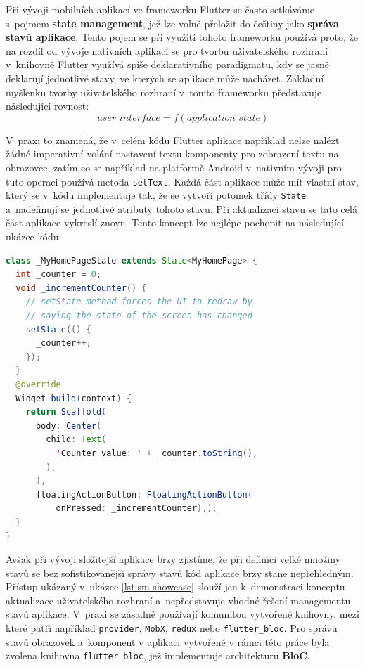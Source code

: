 \documentclass[12pt, a4paper]{article}
\begin{document}
Při vývoji mobilních aplikací ve frameworku Flutter se často setkáváme s~pojmem \textbf{state management}, jež lze volně přeložit do češtiny jako \textbf{správa stavů aplikace}. Tento pojem se při využití tohoto frameworku používá proto, že na rozdíl od vývoje nativních aplikací se pro tvorbu uživatelského rozhraní v~knihovně Flutter využívá spíše deklarativního paradigmatu, kdy se jasně deklarují jednotlivé stavy, ve kterých se aplikace může nacházet. Základní myšlenku tvorby uživatelského rozhraní v~tomto frameworku představuje následující rovnost:
$$
user\_interface = f(application\_state)
$$

V~praxi to znamená, že v~celém kódu Flutter aplikace například nelze nalézt žádné imperativní volání nastavení textu komponenty pro zobrazení textu na obrazovce, zatím co se například na
 platformě Android v~nativním vývoji pro tuto operaci používá metoda \texttt{setText}. Každá část aplikace může mít vlastní stav, který se v~kódu implementuje tak, že se vytvoří potomek 
třídy \texttt{State} a~nadefinují se jednotlivé atributy tohoto stavu. Při aktualizaci stavu se tato celá část aplikace vykreslí znovu. Tento koncept lze nejlépe pochopit na následující 
ukázce kódu:

\begin{lstlisting}[language=Java,caption={Jednoduchá demonstrace aktualizace uživatelského rozhraní ve frameworku Flutter.},captionpos=b, label={lst:sm-showcase}]
class _MyHomePageState extends State<MyHomePage> {
  int _counter = 0;
  void _incrementCounter() {
    // setState method forces the UI to redraw by
    // saying the state of the screen has changed
    setState(() {
      _counter++;
    });
  }
  @override
  Widget build(context) {
    return Scaffold(
      body: Center(
        child: Text(
          'Counter value: ' + _counter.toString(),
        ),
      ),
      floatingActionButton: FloatingActionButton(
          onPressed: _incrementCounter),);
  }
}
\end{lstlisting}

Avšak při vývoji složitejší aplikace brzy zjistíme, že při definici velké množiny stavů se bez sofistikovanější správy stavů kód aplikace brzy stane nepřehledným. Přístup ukázaný v~ukázce \ref{lst:sm-showcase} slouží jen k~demonstraci konceptu aktualizace uživatelského rozhraní a~nepředstavuje vhodné řešení managementu stavů aplikace. V~praxi se zásadně používají komunitou vytvořené knihovny, mezi které patří například \texttt{provider}, \texttt{MobX}, \texttt{redux} nebo \texttt{flutter\_bloc}. Pro správu stavů obrazovek a~komponent v aplikaci vytvořené v rámci této práce byla zvolena knihovna \texttt{flutter\_bloc}, jež implementuje architekturu \textbf{BloC}.
\end{document}
